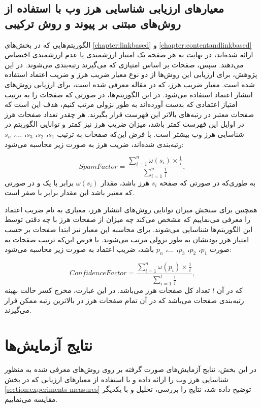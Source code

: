 \documentclass[twoside, a4paper,11pt]{book}
\numberwithin{equation}{chapter}
\numberwithin{table}{chapter}
\numberwithin{figure}{chapter}
\numberwithin{equation}{chapter}
\begin{document}
\subsection{معیارهای ارزیابی شناسایی هرز وب با استفاده از روش‌های مبتنی بر پیوند و روش ترکیبی}
\label{subsection:experiments-measures-link}
الگوریتم‌هایی که در بخش‌های \ref{chapter:ٍlinkbased} و \ref{chapter:ٍcontentandlinkbased} ارائه شده‌اند، در نهایت به هر صفحه یک امتیاز ارزشمندی یا عدم ارزشمندی اختصاص می‌دهند. سپس، صفحات بر اساس امتیازی که می‌گیرند رتبه‌بندی می‌شوند. در این پژوهش، برای ارزیابی این روش‌ها از دو نوع معیار ضریب هرز و ضریب اعتماد استفاده شده است. معیار ضریب هرز، که در مقاله \cite{liu2013combating} معرفی شده است، برای ارزیابی روش‌های انتشار اعتماد استفاده می‌شود. در این الگوریتم‌ها، در صورتی که صفحات را به ترتیب امتیاز اعتمادی که بدست آورده‌اند به طور نزولی مرتب کنیم، هدف این است که صفحات معتبر در رتبه‌های بالاتر این فهرست قرار بگیرند. هر چقدر تعداد صفحات هرز در اوایل این فهرست کمتر باشد، میزان ضریب هرز نیز کمتر و توانایی الگوریتم در شناسایی هرز وب بیشتر است. با فرض این‌که صفحات به ترتیب $s_1$، $s_2$، $s_3$، ...، $s_n$ رتبه‌بندی شده‌اند، ضریب هرز به صورت زیر محاسبه می‌شود:

 \begin{equation}
  	SpamFactor = \frac{\sum\limits_{i=1}^n \omega(s_i)\times\frac{1}{i}}{\sum\limits_{i=1}^n\frac{1}{i}},
    \label{eq:spamfrac}
  \end{equation} 
به طوری‌که در صورتی که صفحه $s_i$ هرز باشد، مقدار $\omega(s_i)$ برابر با یک و در صورتی که معتبر باشد این مقدار برابر با صفر است. 

همچنین برای سنجش میزان توانایی روش‌های انتشار هرز، معیاری به نام ضریب اعتماد را معرفی می‌نماییم که مشخص می‌کند چه میزان از صفحات هرز با چه دقتی توسط این الگوریتم‌ها شناسایی می‌شوند. برای محاسبه این معیار نیز ابتدا صفحات بر حسب امتیاز هرز بودنشان به طور نزولی مرتب می‌شوند. با فرض این‌که ترتیب صفحات به صورت $p_1$، $p_2$، $p_3$، ...، $p_n$ باشد، ضریب اعتماد به صورت زیر محاسبه می‌شود:

 \begin{equation}
  	ConfidenceFactor = \frac{\sum\limits_{i=1}^n \omega(p_i)\times\frac{1}{i}}{\sum\limits_{i=1}^l\frac{1}{i}},
    \label{eq:conffrac}
  \end{equation} 
که در آن $l$ تعداد کل صفحات هرز می‌باشد. در این عبارت، مخرج کسر حالت بهینه رتبه‌بندی صفحات می‌باشد که در آن تمام صفحات هرز در بالاترین رتبه ممکن قرار می‌گیرند.

\section{نتایج آزمایش‌ها}
\label{section:experiments-results}
در این بخش، نتایج آزمایش‌های صورت گرفته بر روی روش‌های معرفی شده به منظور شناسایی هرز وب را ارائه داده و با استفاده از معیارهای ارزیابی که در بخش \ref{section:experiments-measures} توضیح داده شد، نتایج را بررسی، تحلیل و با یکدیگر مقایسه می‌نماییم.
\end{document}
